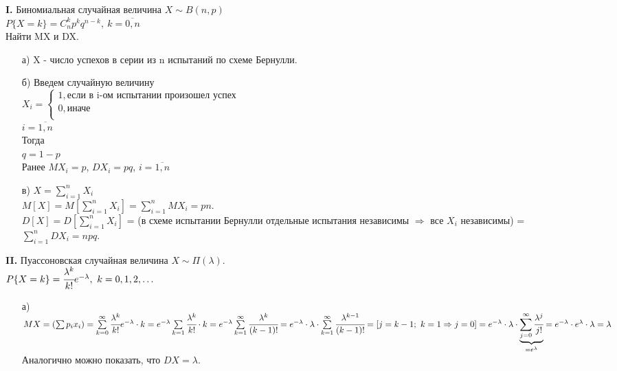 

\textbf{I.} Биномиальная случайная величина $X \sim B(n,p)$ \\
$P\{X = k\} = C^k_n p^k q^{n-k}, \ k = \overline{0,n}$ \\
Найти MX и DX.\\
\begin{enumerate}
	\item[а)] X - число успехов в серии из n испытаний по схеме Бернулли.
	
	\item[б)] Введем случайную величину\\
	$X_i = 
	\begin{cases}
		1, \text{если в i-ом испытании произошел успех} \\
		0, \text{иначе}\\
	\end{cases}$\\
	$i = \overline{1,n}$\\
	Тогда\\
	$q = 1 - p$\\
	Ранее $MX_i = p$, $DX_i = pq$, $i = \overline{1,n}$
	
	\item[в)] $X = \sum\limits_{i = 1}^n X_i$\\
	$M[X] = M\left[\sum\limits_{i = 1}^n X_i\right] = \sum\limits_{i = 1}^n MX_i = pn$.\\
	$D[X] = D\left[\sum\limits_{i = 1}^n X_i\right]$ = (в схеме испытании Бернулли отдельные испытания независимы $\Rightarrow$ все $X_i$ независимы) = $\sum\limits_{i = 1}^n DX_i = npq$.\\
\end{enumerate}


\textbf{II.} Пуассоновская случайная величина $X \sim \Pi(\lambda)$.\\
$P\{X = k\} = \cfrac{\lambda^k}{k!} e^{-\lambda}, \ k = 0, 1, 2, \ldots$\\
\begin{enumerate}
	\item[а)] $MX = \left(\sum p_i x_i\right) = \sum\limits_{k = 0}^\infty \cfrac{\lambda^k}{k!} e^{-\lambda} \cdot k = e^{-\lambda} \sum\limits_{k = 1} \cfrac{\lambda^k}{k!} \cdot k = e^{-\lambda} \sum\limits_{k = 1}^\infty \cfrac{\lambda^k}{(k - 1)!} = e^{-\lambda} \cdot \lambda \cdot \sum\limits_{k = 1}^\infty \cfrac{\lambda^{k - 1}}{(k - 1)!} = \left[j = k - 1; \ k = 1 \Rightarrow j = 0\right]= e^{-\lambda} \cdot \lambda \cdot \underbrace{\sum\limits_{j = 0}^\infty \cfrac{\lambda^j}{j!}}_{= e^\lambda} = e^{-\lambda} \cdot e^\lambda \cdot \lambda = \lambda$\\
	Аналогично можно показать, что $DX = \lambda$.
\end{enumerate}



















